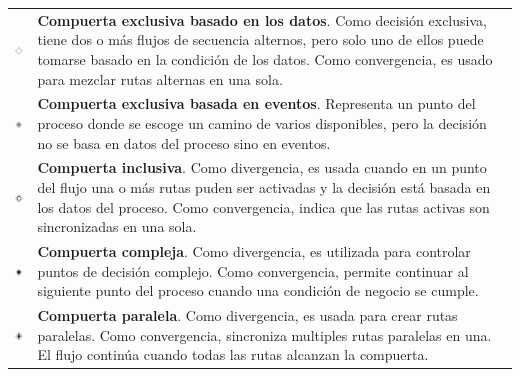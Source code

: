 	\begin{tabular}{| m{} m{} | }%
		\rowcolor[gray]{0.97}%
		\centering\noindent\includegraphics[width=25pt]{introduccion/imagenes/procesos/bpmn/ExclusiveGateway.png} & {\bf Compuerta exclusiva basado en los datos}. Como decisión exclusiva, tiene dos o más flujos de secuencia alternos, pero solo uno de ellos puede tomarse basado en la condición de los datos. Como convergencia, es usado para mezclar rutas alternas en una sola. \\
		\centering\noindent\includegraphics[width=25pt]{introduccion/imagenes/procesos/bpmn/EventBasedGateway.png} & {\bf Compuerta exclusiva basada en eventos}. Representa un punto del proceso donde se escoge un camino de varios disponibles, pero la decisión no se basa en datos del proceso sino en eventos.\\
		\rowcolor[gray]{0.97}%
		\centering\noindent\includegraphics[width=25pt]{introduccion/imagenes/procesos/bpmn/InclusiveGateway.png} & {\bf Compuerta inclusiva}. Como divergencia, es usada cuando en un punto del flujo una o más rutas puden ser activadas y la decisión está basada en los datos del proceso. Como convergencia, indica que las rutas activas son sincronizadas en una sola.\\
		\centering\noindent\includegraphics[width=25pt]{introduccion/imagenes/procesos/bpmn/ComplexGateway.png} & {\bf Compuerta compleja}. Como divergencia, es utilizada para controlar puntos de decisión complejo. Como convergencia, permite continuar al siguiente punto del proceso cuando una condición de negocio se cumple.\\
		\rowcolor[gray]{0.97}%
		\centering\noindent\includegraphics[width=25pt]{introduccion/imagenes/procesos/bpmn/ParallelGateway.png} & {\bf Compuerta paralela}. Como divergencia, es usada para crear rutas paralelas. Como convergencia, sincroniza multiples rutas paralelas en una. El flujo continúa cuando todas las rutas alcanzan la compuerta. \\
	\end{tabular}%

